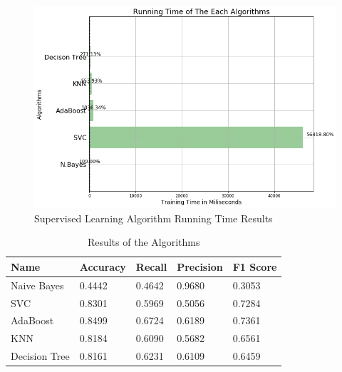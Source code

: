 \documentclass[sigconf]{acmart}
\begin{document}
\begin{figure}[!ht]
  \centering
      \includegraphics[width=\columnwidth]{images/running-time.png}
  \caption{Supervised Learning Algorithm Running Time Results \cite{Borga2017}}\label{fig:result-time}
\end{figure}

\begin{table}[!ht]
\centering
\begin{tabular}{lllll}
\hline
Name                                & Accuracy                    & Recall                      & Precision                   & F1 Score                    \\ \hline
\multicolumn{1}{|l|}{Naive Bayes}   & \multicolumn{1}{l|}{0.4442} & \multicolumn{1}{l|}{0.4642} & \multicolumn{1}{l|}{0.9680} & \multicolumn{1}{l|}{0.3053} \\ \hline
\multicolumn{1}{|l|}{SVC}           & \multicolumn{1}{l|}{0.8301} & \multicolumn{1}{l|}{0.5969} & \multicolumn{1}{l|}{0.5056} & \multicolumn{1}{l|}{0.7284} \\ \hline
\multicolumn{1}{|l|}{AdaBoost}      & \multicolumn{1}{l|}{0.8499} & \multicolumn{1}{l|}{0.6724} & \multicolumn{1}{l|}{0.6189} & \multicolumn{1}{l|}{0.7361} \\ \hline
\multicolumn{1}{|l|}{KNN}           & \multicolumn{1}{l|}{0.8184} & \multicolumn{1}{l|}{0.6090} & \multicolumn{1}{l|}{0.5682} & \multicolumn{1}{l|}{0.6561} \\ \hline
\multicolumn{1}{|l|}{Decision Tree} & \multicolumn{1}{l|}{0.8161} & \multicolumn{1}{l|}{0.6231} & \multicolumn{1}{l|}{0.6109} & \multicolumn{1}{l|}{0.6459} \\ \hline
\end{tabular}
\caption{Results of the Algorithms \cite{Borga2017}}
\label{result-table}
\end{table}
\end{document}
